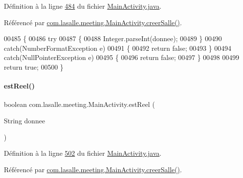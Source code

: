 Définition à la ligne \hyperlink{_main_activity_8java_source_l00484}{484} du fichier \hyperlink{_main_activity_8java_source}{Main\+Activity.\+java}.



Référencé par \hyperlink{_main_activity_8java_source_l00398}{com.\+lasalle.\+meeting.\+Main\+Activity.\+creer\+Salle()}.


\begin{DoxyCode}
00485     \{
00486         \textcolor{keywordflow}{try}
00487         \{
00488             Integer.parseInt(donnee);
00489         \}
00490         \textcolor{keywordflow}{catch}(NumberFormatException e)
00491         \{
00492             \textcolor{keywordflow}{return} \textcolor{keyword}{false};
00493         \}
00494         \textcolor{keywordflow}{catch}(NullPointerException e)
00495         \{
00496             \textcolor{keywordflow}{return} \textcolor{keyword}{false};
00497         \}
00498 
00499         \textcolor{keywordflow}{return} \textcolor{keyword}{true};
00500     \}
\end{DoxyCode}
\mbox{\label{classcom_1_1lasalle_1_1meeting_1_1_main_activity_a8d0cd387540353465b1982157b20631c}} 
\paragraph{\texorpdfstring{est\+Reel()}{estReel()}}
{\footnotesize\ttfamily boolean com.\+lasalle.\+meeting.\+Main\+Activity.\+est\+Reel (\begin{DoxyParamCaption}\item[{String}]{donnee }\end{DoxyParamCaption})\hspace{0.3cm}{\ttfamily [private]}}



Définition à la ligne \hyperlink{_main_activity_8java_source_l00502}{502} du fichier \hyperlink{_main_activity_8java_source}{Main\+Activity.\+java}.



Référencé par \hyperlink{_main_activity_8java_source_l00398}{com.\+lasalle.\+meeting.\+Main\+Activity.\+creer\+Salle()}.



